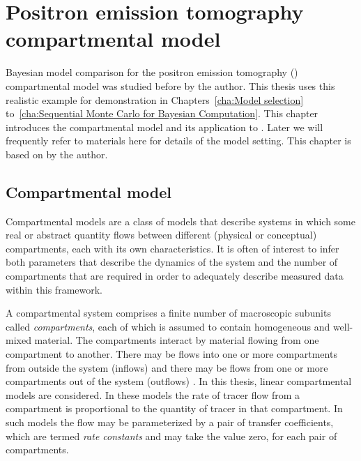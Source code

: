 \chapter{Positron emission tomography compartmental model}
\label{cha:Positron emission tomography compartmental model}

Bayesian model comparison for the positron emission tomography (\pet) compartmental model was studied before by the author. This thesis uses this realistic example for demonstration in Chapters~\ref{cha:Model selection} to~\ref{cha:Sequential Monte Carlo for Bayesian Computation}. This chapter introduces the compartmental model and its application to \pet. Later we will frequently refer to materials here for details of the model setting. This chapter is based on \cite{Zhou2013} by the author.

\section{Compartmental model}
\label{sec:Compartmental model}

Compartmental models are a class of models that describe systems in which some real or abstract quantity flows between different (physical or conceptual) compartments, each with its own characteristics. It is often of interest to infer both parameters that describe the dynamics of the system and the number of compartments that are required in order to adequately describe measured data within this framework.

A compartmental system comprises a finite number of macroscopic subunits called \emph{compartments}, each of which is assumed to contain homogeneous and well-mixed material. The compartments interact by material flowing from one compartment to another. There may be flows into one or more compartments from outside the system (inflows) and there may be flows from one or more compartments out of the system (outflows) \cite{Jacquez:1996gc}. In this thesis, linear compartmental models are considered. In these models the rate of tracer flow from a compartment is proportional to the quantity of tracer in that compartment. In such models the flow may be parameterized by a pair of transfer coefficients, which are termed \emph{rate constants} and may take the value zero, for each pair of compartments.

